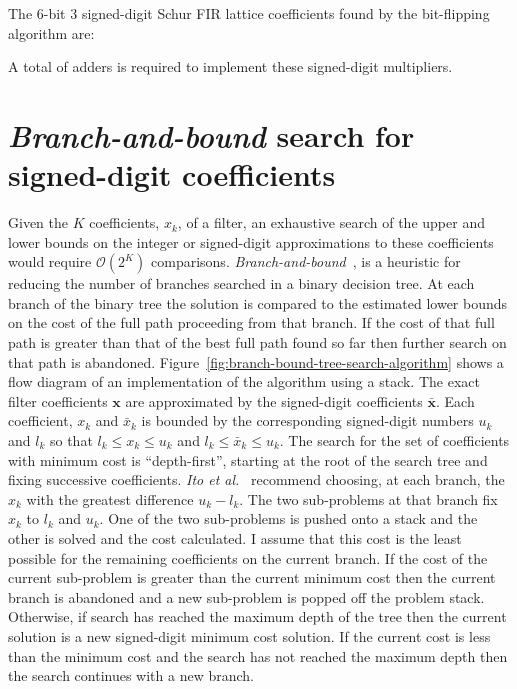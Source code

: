 \documentclass[a4paper,twoside,10pt,english]{report}
\begin{document}
The 6-bit 3 signed-digit Schur FIR lattice coefficients found by the 
bit-flipping algorithm are:
\begin{small}

\end{small}
A total of adders is
required to implement these signed-digit multipliers.
\clearpage 
\section{\label{sec:branch-bound-search-signed-digit-coefficients}\emph{Branch-and-bound} search for signed-digit coefficients}
Given the $K$ coefficients, $x_{k}$, of a filter, an exhaustive search of the
upper and lower bounds on the integer or signed-digit approximations to these
coefficients would require $\mathcal{O}\left(2^{K}\right)$ comparisons.
\emph{Branch-and-bound}~\cite{LandDoig_AutomaticMethodSolvingDiscreteProgrammingProblems},
\cite[p.627]{Sedgewick_AlgorithmsInCPlusPlus} is a heuristic for reducing the
number of branches searched in a binary decision tree. At each branch
of the binary tree the solution is compared to the estimated lower bounds
on the cost of the full path proceeding from that branch. If the cost of that 
full path is greater than that of the best full path found so far then further
search on that path is abandoned.
Figure~\ref{fig:branch-bound-tree-search-algorithm} shows a flow diagram of an 
implementation of the algorithm using a stack. The exact filter
coefficients $\boldsymbol{x}$ are approximated by the signed-digit coefficients
$\bar{\boldsymbol{x}}$. Each coefficient, $x_{k}$ and $\bar{x}_{k}$ is bounded
by the corresponding signed-digit numbers $u_{k}$ and $l_{k}$ so that
$l_{k}\le{}x_{k}\le{}u_{k}$ and $l_{k}\le{}\bar{x}_{k}\le{}u_{k}$. The search
for the set of coefficients with minimum cost is ``depth-first'', starting at
the root of the search tree and fixing successive coefficients.  \emph{Ito et
  al.}~\cite{Ito_PowersOfTwoAllocationFIR} recommend choosing, at each branch,
the $x_{k}$ with the greatest difference $u_{k}-l_{k}$. The two sub-problems at
that branch fix $x_{k}$ to $l_{k}$ and $u_{k}$. One of the two sub-problems is
pushed onto a stack and the other is solved and the cost calculated. I assume 
that this cost is the least possible for the remaining coefficients on
the current branch. If the cost of the current sub-problem is greater than the
current minimum cost then the current branch is abandoned and a new
sub-problem is popped off the problem stack. Otherwise, if search has
reached the maximum depth of the tree then the current solution is a new 
signed-digit minimum cost solution. If the current cost is less than the 
minimum cost and the search has not reached the maximum depth then the search 
continues with a new branch. 
\end{document}
